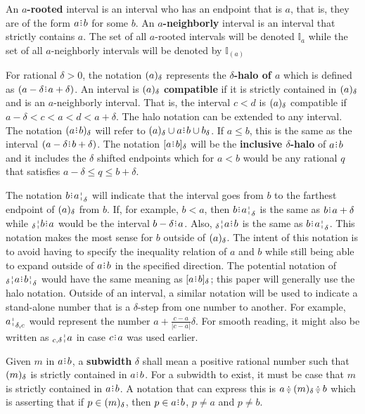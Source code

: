 \documentclass[12pt]{article}
\begin{document}
An \textbf{$a$-rooted} interval is an interval who has an endpoint that is $a$, that is, they are of the form $a\rint b$ for some $b$. An  \textbf{$a$-neighborly} interval is an interval that strictly contains $a$. The set of all $a$-rooted intervals will be denoted $\mathbb{I}_a$ while the set of all $a$-neighborly intervals will be denoted by $\mathbb{I}_{(a)}$

For rational $\delta > 0$, the notation $(a)_{\delta}$ represents the \textbf{$\delta$-halo of $a$} which is defined as $(a -\delta \rint  a+ \delta)$. An interval is $(a)_{\delta}$ \textbf{compatible }if it is strictly contained in $(a)_{\delta}$ and is an $a$-neighborly interval. That is, the interval $c \lt d$ is $(a)_{\delta}$ compatible if $a- \delta < c < a < d < a+ \delta$. The halo notation can be extended to any interval. The notation $\halo{a\rint b}$ will refer to $\halo{a} \cup a\rint b \cup b_\delta$. If $a \leq b$, this is the same as the interval $(a-\delta\rint b+\delta)$. The notation $\clhalo{a\rint b}$ will be the \textbf{inclusive $\delta$-halo} of $a\rint b$ and it includes the $\delta$ shifted endpoints which for $a \lt b$ would be any rational $q$ that satisfies $a - \delta \leq q \leq b+ \delta$. 


The notation $b\rint \fuzbright{a}$ will indicate that the interval goes from $b$ to the farthest endpoint of $(a)_{\delta}$ from $b$. If, for example, $b < a$, then $b\rint \fuzbright{a}$ is the same as $b\rint a+\delta$ while $\fuzbleft{b} \rint a$ would be the interval $b-\delta\rint a$. Also, $\fuzbleft{a} \rint  b$ is the same as $b\rint \fuzbright{a}$. This notation makes the most sense for $b$ outside of $(a)_{\delta}$. The intent of this notation is to avoid having to specify the inequality relation of $a$ and $b$ while still being able to expand outside of $a\rint b$ in the specified direction. The potential notation of $\fuzbleft{a}\rint \fuzbright{b}$ would have the same meaning as $[a\rint b]_\delta$; this paper will generally use the halo notation. Outside of an interval, a similar notation will be used to indicate a stand-alone number that is a $\delta$-step from one number to another. For example, $\fuzbright[\delta,c]{a}$ would represent the number $a + \frac{c-a}{|c-a|}\delta$. For smooth reading, it might also be written as $\fuzbleft[c, \delta]{a}$ in case $c \rint a$ was used earlier. 

Given $m$ in $a \rint  b$, a \textbf{subwidth} $\delta$ shall mean a positive rational number such that $(m)_{\delta}$ is strictly contained in $a\rint b$. For a subwidth to exist, it must be case that $m$ is strictly contained in $a\rint b$. A notation that can express this is $a \betneq \halo{m} \betneq b$ which is asserting that if $p \in (m)_{\delta}$, then $p \in a\rint b$, $p \neq a$ and $p \neq b$. 
\end{document}
